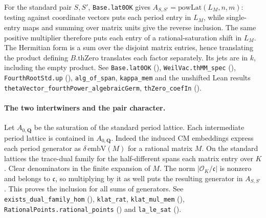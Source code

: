 For the standard pair $S,S'$, \nolinkurl{Base.lat0OK} gives
$A_{S,S'}=\mathrm{powLat}(L_M,n,m)$: testing against coordinate
vectors puts each period entry in $L_M$, while single-entry maps and
summing over matrix units give the reverse inclusion. The same
positive multiplier therefore puts each entry of a rational-saturation
shift in $L_M$. The Hermitian form is a sum over the disjoint
matrix entries, hence translating the product defining $B.\mathrm{thZero}$
translates each factor separately. Its jets are in $k$, including
the empty product. See \nolinkurl{Base.lat0OK}
(),
\nolinkurl{WeilVac.thMM_spec} (),
\nolinkurl{FourthRootStd.up} (),
\nolinkurl{alg_of_span}, \nolinkurl{kappa_mem} and the unshifted Lean
results \nolinkurl{thetaVector_fourthPower_algebraicGerm}, \nolinkurl{thZero_coefIn}
().

\paragraph{The two intertwiners and the pair character.}
Let $A_{0,\mathbf Q}$ be the saturation of the standard period lattice.
Each intermediate period lattice is contained in $A_{0,\mathbf Q}$.
Indeed the induced CM embeddings express each period generator as
$\delta\,\mathrm{embV}(M)$ for a rational matrix $M$. On the standard
lattices the trace-dual family for the half-different spans each matrix
entry over $K$. Clear denominators in the finite expansion of $M$.
The norm $|\mathcal O_K/\mathfrak c|$ is nonzero and belongs to
$\mathfrak c$, so multiplying by it as well puts the resulting generator
in $A_{S,S'}$. This proves the inclusion for all sums of generators.
See \nolinkurl{exists_dual_family_hom} (),
\nolinkurl{klat_rat}, \nolinkurl{klat_mul_mem} (),
\nolinkurl{RationalPoints.rational_points} ()
and \nolinkurl{la_le_sat} ().

